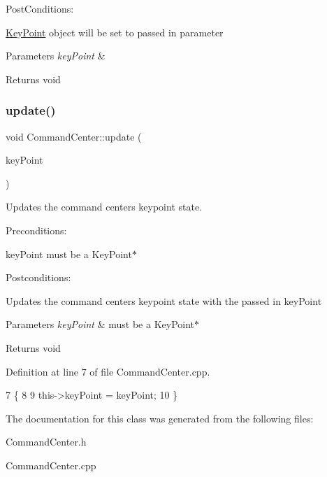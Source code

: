 Post\+Conditions\+:
\begin{DoxyItemize}
\item \hyperlink{classKeyPoint}{Key\+Point} object will be set to passed in parameter
\end{DoxyItemize}


\begin{DoxyParams}{Parameters}
{\em key\+Point} & \\
\hline
\end{DoxyParams}
\begin{DoxyReturn}{Returns}
void 
\end{DoxyReturn}
\mbox{\label{classCommandCenter_a1aee52be7351e2e2c78c8d239d31cff0}} 
\subsubsection{\texorpdfstring{update()}{update()}}
{\footnotesize\ttfamily void Command\+Center\+::update (\begin{DoxyParamCaption}\item[{\hyperlink{classKeyPoint}{Key\+Point} $\ast$}]{key\+Point }\end{DoxyParamCaption})}



Updates the command center\textquotesingle{}s keypoint state. 

Preconditions\+:
\begin{DoxyItemize}
\item key\+Point must be a Key\+Point$\ast$
\end{DoxyItemize}

Postconditions\+:
\begin{DoxyItemize}
\item Updates the command centers\textquotesingle{} keypoint state with the passed in key\+Point
\end{DoxyItemize}


\begin{DoxyParams}{Parameters}
{\em key\+Point} & must be a Key\+Point$\ast$ \\
\hline
\end{DoxyParams}
\begin{DoxyReturn}{Returns}
void 
\end{DoxyReturn}


Definition at line 7 of file Command\+Center.\+cpp.


\begin{DoxyCode}
7                                              \{
8 
9     this->keyPoint = keyPoint;
10 \}
\end{DoxyCode}


The documentation for this class was generated from the following files\+:\begin{DoxyCompactItemize}
\item 
Command\+Center.\+h\item 
Command\+Center.\+cpp\end{DoxyCompactItemize}
